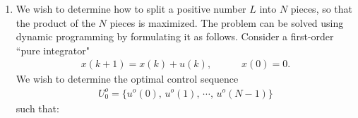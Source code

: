 \documentclass[letterpaper,12pt]{article}
\begin{document}
\begin{enumerate}




\item
We wish to determine how to split a positive number $L$ into $N$ pieces, so that the product of the $N$ pieces is maximized. The problem can be solved using dynamic programming by formulating it as follows. Consider a first-order ``pure integrator"
\begin{align*}
    x(k+1) = x(k) + u(k),\hspace{3em} x(0) = 0.
\end{align*}
We wish to determine the optimal control sequence
\begin{align*}
    U_0^o = \{ u^o(0),\,u^o(1),\,\cdots,\, u^o(N-1)\}
\end{align*}
such that:


\end{enumerate}
\end{document}
